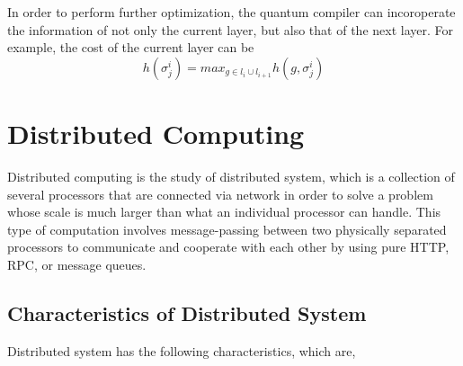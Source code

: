 In order to perform further optimization, the quantum compiler can incoroperate the information of not only the current layer, but also that of the next layer.  For example, the cost of the current layer can be 
$$ h(\sigma^i_j) = max_{g \in l_i \cup l_{i+1}} h(g, \sigma^i_j)$$

\newpage

\section{Distributed Computing}

 Distributed computing is the study of distributed system, which is a collection of several processors that are connected via network in order to solve a problem whose scale is much larger than what an individual processor can handle.  This type of computation involves message-passing between two physically separated processors to communicate and cooperate with each other by using pure HTTP, RPC, or message queues. \cite{distributedcomputingtext} 
 
 \subsection{Characteristics of Distributed System}
 \par Distributed system has the following characteristics, which are,
 
